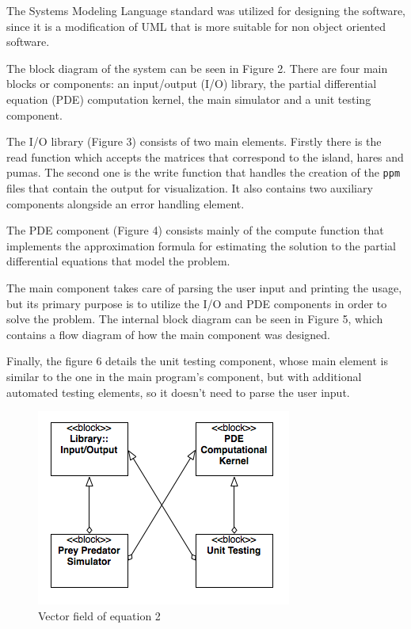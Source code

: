 \documentclass[12pt,a4paper]{article}
\begin{document}
The Systems Modeling Language standard was utilized for designing the software, since it is a modification of UML that is more suitable for non object oriented software. 

The block diagram of the system can be seen in Figure 2. There are four main blocks or components: an input/output (I/O) library, the partial differential equation (PDE) computation kernel, the main simulator and a unit testing component.

The I/O library (Figure 3) consists of two main elements. Firstly there is the read function which accepts the matrices that correspond to the island, hares and pumas. The second one is the write function that handles the creation of the \texttt{ppm} files that contain the output for visualization. It also contains two auxiliary components alongside an error handling element.

The PDE component (Figure 4) consists mainly of the compute function that implements the approximation formula for estimating the solution to the partial differential equations that model the problem.

The main component takes care of parsing the user input and printing the usage, but its primary purpose is to utilize the I/O and PDE components in order to solve the problem. The internal block diagram can be seen in Figure 5, which contains a flow diagram of how the main component was designed.

Finally, the figure 6 details the unit testing component, whose main element is similar to the one in the main program's component, but with additional automated testing elements, so it doesn't need to parse the user input.


\begin{figure}[hb]
    \centering
    \includegraphics[scale=0.6]{images/blockdesign.png}
    \caption{Vector field of equation 2}
\end{figure}
\end{document}
